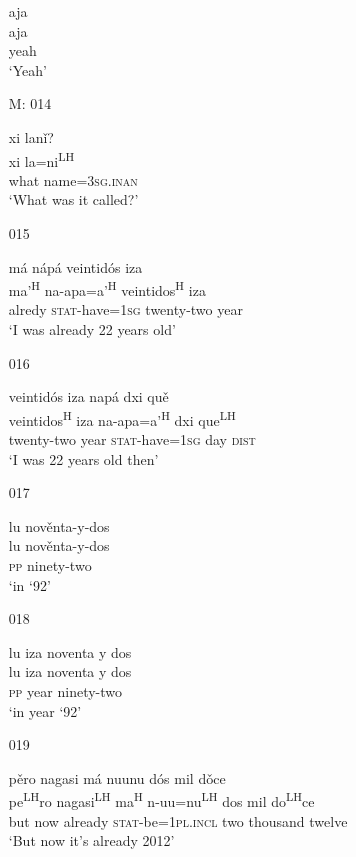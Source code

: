 \begin{itemize}
\glll aja \\
aja \\
yeah  \\
\glt `Yeah'
 

\item[M: 014]
   
\glll xi lan\v{i}? \\
xi la=ni\textsuperscript{LH} \\
what name=\textsc{3sg.inan} \\
\glt `What was it called?'
 

\item[015]
   
\glll m\'{a} n\'{a}p\'{a} veintid\'{o}s iza \\
ma'\textsuperscript{H} na-apa=a'\textsuperscript{H} veintidos\textsuperscript{H} iza \\
alredy \textsc{stat}-have=\textsc{1sg} twenty-two year \\
\glt `I was already 22 years old'
 

\item[016]
   
\glll veintid\'{o}s iza nap\'{a} dxi qu\v{e} \\ 
veintidos\textsuperscript{H} iza na-apa=a'\textsuperscript{H} dxi que\textsuperscript{LH} \\
twenty-two year \textsc{stat}-have=\textsc{1sg} day \textsc{dist} \\
\glt `I was 22 years old then'
 

\item[017]
   
\glll lu nov\v{e}nta-y-dos \\
 lu nov\v{e}nta-y-dos \\
 \textsc{pp} ninety-two \\
\glt `in `92'
 

\item[018]
  
\glll  lu iza noventa y dos \\
lu iza noventa y dos \\
\textsc{pp} year ninety-two \\
\glt `in year `92'
 

\item[019]
   
\glll p\v{e}ro nagasi m\'{a} nuunu d\'{o}s mil d\v{o}ce \\
pe\textsuperscript{LH}ro nagasi\textsuperscript{LH} ma\textsuperscript{H} n-uu=nu\textsuperscript{LH} dos mil do\textsuperscript{LH}ce \\
but now already \textsc{stat}-be=\textsc{1pl.incl} two thousand twelve \\
\glt `But now it's already 2012'
 


\end{itemize}
